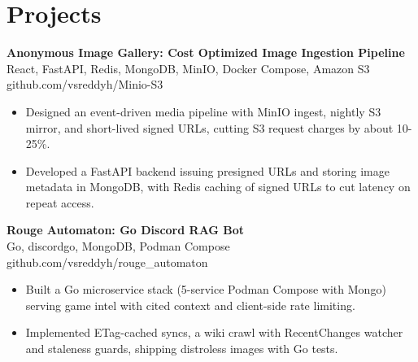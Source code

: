 \documentclass[a4paper,11pt]{article}
\newcommand{\resumeItem}[1]{\item \small{#1}}
\newcommand{\resumeSubheading}[4]{%
  \textbf{#1} \hfill \textbf{#2} \\
{#3} \hfill {#4}
}
\newcommand{\resumeSubHeadingListStart}{\begin{itemize}}
\newcommand{\resumeSubHeadingListEnd}{\end{itemize}}
\begin{document}
\section*{Projects}

\resumeSubheading
{Anonymous Image Gallery: Cost Optimized Image Ingestion Pipeline}{}{React, FastAPI, Redis, MongoDB, MinIO, Docker Compose, Amazon S3}{github.com/vsreddyh/Minio-S3}
\resumeSubHeadingListStart
\resumeItem{Designed an event-driven media pipeline with MinIO ingest, nightly S3 mirror, and short-lived signed URLs, cutting S3 request charges by about 10-25\%.}
\resumeItem{Developed a FastAPI backend issuing presigned URLs and storing image metadata in MongoDB, with Redis caching of signed URLs to cut latency on repeat access.}
\resumeSubHeadingListEnd

\resumeSubheading
{Rouge Automaton: Go Discord RAG Bot}{}{Go, discordgo, MongoDB, Podman Compose}{github.com/vsreddyh/rouge\_automaton}
\resumeSubHeadingListStart
\resumeItem{Built a Go microservice stack (5-service Podman Compose with Mongo) serving game intel with cited context and client-side rate limiting.}
\resumeItem{Implemented ETag-cached syncs, a wiki crawl with RecentChanges watcher and staleness guards, shipping distroless images with Go tests.}
\resumeSubHeadingListEnd


\vspace{-0.6em}
\end{document}
